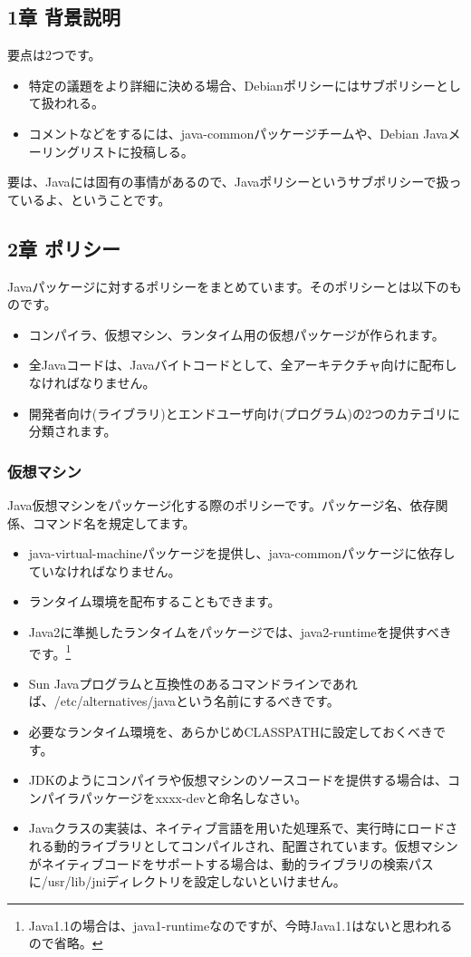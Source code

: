 \documentclass[mingoth,a4paper]{jsarticle}
\begin{document}
\subsection{1章 背景説明}
要点は2つです。
\begin{itemize}
\item 特定の議題をより詳細に決める場合、Debianポリシーにはサブポリシーとして扱われる。
\item コメントなどをするには、java-commonパッケージチームや、Debian Javaメーリングリストに投稿しる。
\end{itemize}
要は、Javaには固有の事情があるので、Javaポリシーというサブポリシーで扱っているよ、ということです。

\subsection{2章 ポリシー}
Javaパッケージに対するポリシーをまとめています。そのポリシーとは以下のものです。
\begin{itemize}
\item コンパイラ、仮想マシン、ランタイム用の仮想パッケージが作られます。
\item 全Javaコードは、Javaバイトコードとして、全アーキテクチャ向けに配布しなければなりません。
\item 開発者向け(ライブラリ)とエンドユーザ向け(プログラム)の2つのカテゴリに分類されます。
\end{itemize}

\subsubsection{仮想マシン}
Java仮想マシンをパッケージ化する際のポリシーです。パッケージ名、依存関係、コマンド名を規定してます。
\begin{itemize}
\item java-virtual-machineパッケージを提供し、java-commonパッケージに依存していなければなりません。
\item ランタイム環境を配布することもできます。
\item Java2に準拠したランタイムをパッケージでは、java2-runtimeを提供すべきです。\footnote{Java1.1の場合は、java1-runtimeなのですが、今時Java1.1はないと思われるので省略。}
\item Sun Javaプログラムと互換性のあるコマンドラインであれば、/etc/alternatives/javaという名前にするべきです。
\item 必要なランタイム環境を、あらかじめCLASSPATHに設定しておくべきです。
\item JDKのようにコンパイラや仮想マシンのソースコードを提供する場合は、コンパイラパッケージをxxxx-devと命名しなさい。
\item Javaクラスの実装は、ネイティブ言語を用いた処理系で、実行時にロードされる動的ライブラリとしてコンパイルされ、配置されています。仮想マシンがネイティブコードをサポートする場合は、動的ライブラリの検索パスに/usr/lib/jniディレクトリを設定しないといけません。
\end{itemize}
\end{document}
